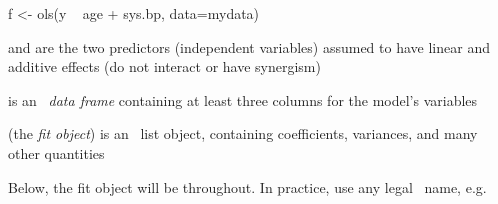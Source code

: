 \begin{Schunk}
\begin{Sinput}
f <- ols(y ~ age + sys.bp, data=mydata)
\end{Sinput}
\end{Schunk}
\item {} and  are the two predictors (independent
variables) assumed to have linear and additive effects (do not
interact or have synergism)
\item {} is an \R\ \emph{data frame} containing at least
  three columns for the model's variables
\item {} (the \emph{fit object}) is an \R\ list object, containing
  coefficients, variances, and many other quantities
\item Below, the fit object will be  throughout.  In practice,
  use any legal \R\  name, e.g. 
\ei

